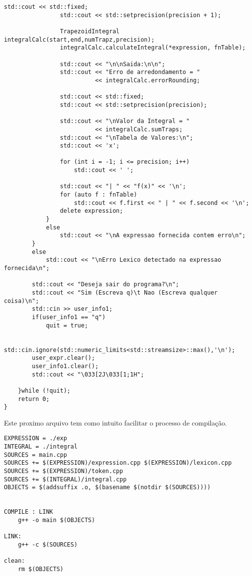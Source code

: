 \documentclass[12pt, letterpaper]{article}
\newcommand\tabd[1][0.2cm]{\hspace*{#1}}
\begin{document}
\begin{lstlisting}[caption=main.cpp]
                std::cout << std::fixed;
                std::cout << std::setprecision(precision + 1);
                
                TrapezoidIntegral integralCalc(start,end,numTrapz,precision);
                integralCalc.calculateIntegral(*expression, fnTable);

                std::cout << "\n\nSaida:\n\n";
                std::cout << "Erro de arredondamento = " 
                          << integralCalc.errorRounding;

                std::cout << std::fixed;
                std::cout << std::setprecision(precision);

                std::cout << "\nValor da Integral = " 
                          << integralCalc.sumTraps;
                std::cout << "\nTabela de Valores:\n";
                std::cout << 'x'; 

                for (int i = -1; i <= precision; i++)
                    std::cout << ' ';

                std::cout << "| " << "f(x)" << '\n';
                for (auto f : fnTable)
                    std::cout << f.first << " | " << f.second << '\n';
                delete expression;
            }
            else
                std::cout << "\nA expressao fornecida contem erro\n";
        }
        else
            std::cout << "\nErro Lexico detectado na expressao fornecida\n";

        std::cout << "Deseja sair do programa?\n";
        std::cout << "Sim (Escreva q)\t Nao (Escreva qualquer coisa)\n";
        std::cin >> user_info1;
        if(user_info1 == "q")
            quit = true;

        std::cin.ignore(std::numeric_limits<std::streamsize>::max(),'\n');
        user_expr.clear();
        user_info1.clear(); 
        std::cout << "\033[2J\033[1;1H";

    }while (!quit); 
    return 0;
}
\end{lstlisting}

\newpage

\tabd Este proximo arquivo tem como intuito facilitar o processo de compilação.
\begin{lstlisting}[caption=Makefile]
EXPRESSION = ./exp
INTEGRAL = ./integral
SOURCES = main.cpp
SOURCES += $(EXPRESSION)/expression.cpp $(EXPRESSION)/lexicon.cpp 
SOURCES += $(EXPRESSION)/token.cpp
SOURCES += $(INTEGRAL)/integral.cpp
OBJECTS = $(addsuffix .o, $(basename $(notdir $(SOURCES))))


COMPILE : LINK 
	g++ -o main $(OBJECTS) 

LINK:
	g++ -c $(SOURCES)

clean:
	rm $(OBJECTS)
  
\end{lstlisting}
\end{document}
